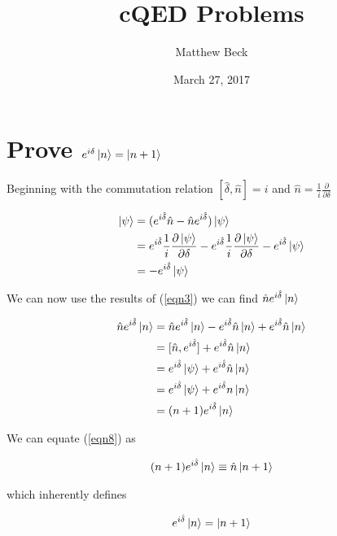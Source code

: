 \documentclass[12pt, reqno]{amsart}
\title{cQED Problems}
\author{Matthew Beck}
\date{March 27, 2017} %
\begin{document}
\maketitle

\section{Prove $e^{i\delta} \ket{n} = \ket{n+1}$}

Beginning with the commutation relation $[\hat{\delta},\hat{n}] = i$ and $\hat{n} = \frac{1}{i}\frac{\partial}{\partial \delta}$

\begin{align}
[e^{i\hat{\delta}},\hat{n}] \ket{\psi} &= (e^{i\hat{\delta}}\hat{n} - \hat{n}e^{i\hat{\delta}})\ket{\psi} \\
&= e^{i\hat{\delta}} \frac{1}{i}\frac{\partial \ket{\psi}}{\partial \delta} - e^{i\hat{\delta}} \frac{1}{i}\frac{\partial \ket{\psi}}{\partial \delta} - e^{i \hat{\delta}} \ket{\psi} \\
&=  - e^{i \hat{\delta}} \ket{\psi} \label{eqn3}
\end{align}

We can now use the results of (\ref{eqn3}) we can find $\hat{n}e^{i\hat{\delta}}\ket{n}$

\begin{align}
\hat{n}e^{i\hat{\delta}}\ket{n} &= \hat{n}e^{i\hat{\delta}}\ket{n} -e^{i\hat{\delta}} \hat{n}\ket{n} + e^{i\hat{\delta}} \hat{n}\ket{n} \\
&= [\hat{n}, e^{i\hat{\delta}}] + e^{i\hat{\delta}} \hat{n}\ket{n} \\
&= e^{i \hat{\delta}} \ket{\psi}  + e^{i\hat{\delta}} \hat{n}\ket{n} \\
&= e^{i \hat{\delta}} \ket{\psi}  + e^{i\hat{\delta}} n\ket{n} \\
&= (n+1) e^{i\hat{\delta}}\ket{n} \label{eqn8}
\end{align}

We can equate (\ref{eqn8}) as

\begin{align}
(n+1) e^{i\hat{\delta}}\ket{n} \equiv \hat{n} \ket{n+1}
\end{align}

which inherently defines

\begin{align}
 e^{i\hat{\delta}}\ket{n} = \ket{n+1}
\end{align}
\end{document}
